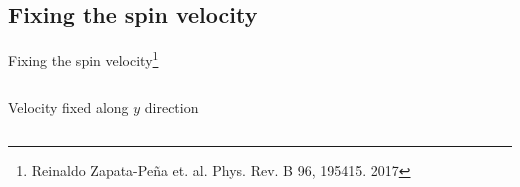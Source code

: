 \documentclass{beamer}
\begin{document}
\begin{frame}
{\begin{columns}
\begin{figure}[h!]
\begin{tikzpicture}
\end{tikzpicture}
\end{figure}


\end{columns}

}

\end{frame}


\subsection{Fixing the spin velocity}

\begin{frame}

{\Large Fixing the spin velocity\footnote[frame]
{\tiny Reinaldo Zapata-Pe\~na et. al. Phys. Rev. B 96, 195415. 2017}}


{\small

\begin{columns}


\vspace{-5mm}

\begin{center}
{\large Velocity fixed along $y$ direction}
\end{center}

\vspace{-9mm}

\begin{figure}[h!]
\end{figure}
\end{columns}}
\end{frame}
\end{document}
